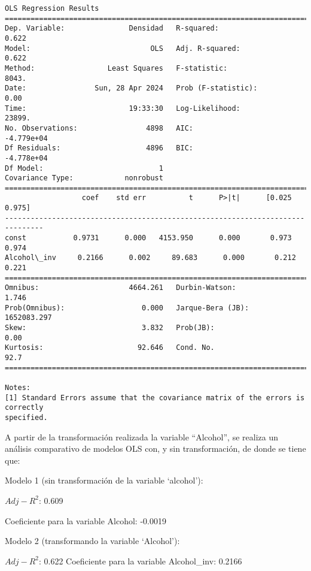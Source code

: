 \documentclass[11pt]{article}
\begin{document}
    \begin{Verbatim}[commandchars=\\\{\}]
                            OLS Regression Results
==============================================================================
Dep. Variable:               Densidad   R-squared:                       0.622
Model:                            OLS   Adj. R-squared:                  0.622
Method:                 Least Squares   F-statistic:                     8043.
Date:                Sun, 28 Apr 2024   Prob (F-statistic):               0.00
Time:                        19:33:30   Log-Likelihood:                 23899.
No. Observations:                4898   AIC:                        -4.779e+04
Df Residuals:                    4896   BIC:                        -4.778e+04
Df Model:                           1
Covariance Type:            nonrobust
===============================================================================
                  coef    std err          t      P>|t|      [0.025      0.975]
-------------------------------------------------------------------------------
const           0.9731      0.000   4153.950      0.000       0.973       0.974
Alcohol\_inv     0.2166      0.002     89.683      0.000       0.212       0.221
==============================================================================
Omnibus:                     4664.261   Durbin-Watson:                   1.746
Prob(Omnibus):                  0.000   Jarque-Bera (JB):          1652083.297
Skew:                           3.832   Prob(JB):                         0.00
Kurtosis:                      92.646   Cond. No.                         92.7
==============================================================================

Notes:
[1] Standard Errors assume that the covariance matrix of the errors is correctly
specified.
    \end{Verbatim}

    A partir de la transformación realizada la variable ``Alcohol'', se
realiza un análisis comparativo de modelos OLS con, y sin
transformación, de donde se tiene que:

Modelo 1 (sin transformación de la variable `alcohol'):

\(Adj - R^2\): 0.609

Coeficiente para la variable Alcohol: -0.0019

Modelo 2 (transformando la variable `Alcohol'):

\(Adj - R^2\): 0.622 Coeficiente para la variable Alcohol\_inv: 0.2166
\end{document}
